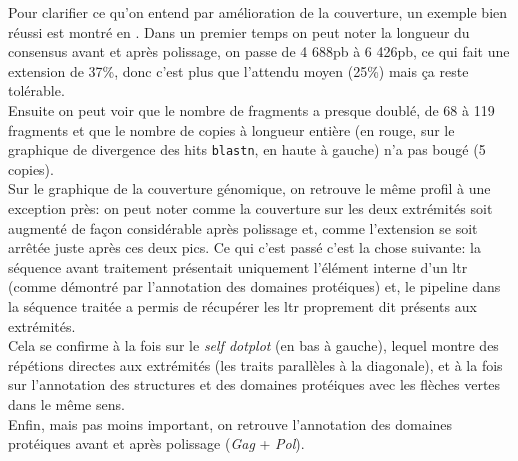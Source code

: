 \documentclass[10pt]{article}
\begin{document}
Pour clarifier ce qu'on entend par amélioration de la couverture, un exemple bien réussi est montré en \figureautorefname{ \ref{fig:BURDOCK}}. Dans un premier temps on peut noter la longueur du consensus avant et après polissage, on passe de 4 688pb à 6 426pb, ce qui fait une extension de 37\%, donc c'est plus que l'attendu moyen (25\%) mais ça reste tolérable. \\
Ensuite on peut voir que le nombre de fragments a presque doublé, de 68 à 119 fragments et que le nombre de copies à longueur entière (en rouge, sur le graphique de divergence des hits \texttt{blastn}, en haute à gauche) n'a pas bougé (5 copies). \\
Sur le graphique de la couverture génomique, on retrouve le même profil à une exception près: on peut noter comme la couverture sur les deux extrémités soit augmenté de façon considérable après polissage et, comme l'extension se soit arrêtée juste après ces deux pics. Ce qui c'est passé c'est la chose suivante: la séquence avant traitement présentait uniquement l'élément interne d'un \acrshort{ltr} (comme démontré par l'annotation des domaines protéiques) et, le pipeline dans la séquence traitée a permis de récupérer les \acrfull{ltr} proprement dit présents aux extrémités. \\ 
Cela se confirme à la fois sur le \textit{self dotplot} (en bas à gauche), lequel montre des répétions directes aux extrémités (les traits parallèles à la diagonale), et à la fois sur l'annotation des structures et des domaines protéiques avec les flèches vertes dans le même sens. \\
Enfin, mais pas moins important, on retrouve l'annotation des domaines protéiques avant et après polissage (\textit{Gag} + \textit{Pol}). \\

\bigskip
\end{document}
